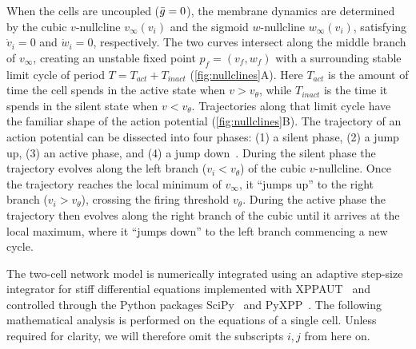 \documentclass[../manuscript.tex]{subfiles}
\begin{document}
When the cells are uncoupled ($\bar g=0$), the membrane dynamics are determined by the cubic $v$-nullcline $v_{\infty}(v_i)$ and the sigmoid $w$-nullcline $w_{\infty}(v_{i})$, satisfying $\dot v_{i}=0$ and $\dot w_{i}=0$, respectively.
The two curves intersect along the middle branch of $v_{\infty}$, creating an unstable fixed point $p_{f}=(v_{f},w_{f})$ with a surrounding stable limit cycle of period $T=T_{act}+T_{inact}$ (\cref{fig:nullclines}A).
Here $T_{act}$ is the amount of time the cell spends in the active state when $v>v_\theta$, while $T_{inact}$ is the time it spends in the silent state when $v<v_\theta$.
Trajectories along that limit cycle have the familiar shape of the action potential (\cref{fig:nullclines}B).
The trajectory of an action potential can be dissected into four phases: (1) a silent phase, (2) a jump up, (3) an active phase, and (4) a jump down~\citep[see e.g.][]{ermentrout2010}.
During the silent phase the trajectory evolves along the left branch ($v_{i}<v_{\theta}$) of the cubic $v$-nullcline.
Once the trajectory reaches the local minimum of $v_{\infty}$, it ``jumps up'' to the right branch ($v_{i}>v_{\theta}$), crossing the firing threshold $v_{\theta}$.
During the active phase the trajectory then evolves along the right branch of the cubic until it arrives at the local maximum, where it ``jumps down'' to the left branch commencing a new cycle.

The two-cell network model is numerically integrated using an adaptive step-size integrator for stiff differential equations implemented with XPPAUT~\citep{ermentrout2002} and controlled through the Python packages SciPy~\citep{scipy2020} and PyXPP~\citep{pyxpp}.
The following mathematical analysis is performed on the equations of a single cell.
Unless required for clarity, we will therefore omit the subscripts $i,j$ from here on.
\end{document}
